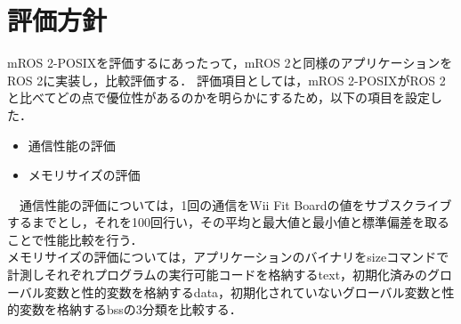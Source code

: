 \documentclass[11pt]{ujarticle}
\begin{document}
\section{評価方針}
mROS 2-POSIXを評価するにあったって，mROS 2と同様のアプリケーションをROS 2に実装し，比較評価する．
評価項目としては，mROS 2-POSIXがROS 2と比べてどの点で優位性があるのかを明らかにするため，以下の項目を設定した．
\begin{itemize}
	\item 通信性能の評価
	\item メモリサイズの評価
\end{itemize}
　通信性能の評価については，1回の通信をWii Fit Boardの値をサブスクライブするまでとし，それを100回行い，その平均と最大値と最小値と標準偏差を取ることで性能比較を行う．
\\メモリサイズの評価については，アプリケーションのバイナリをsizeコマンドで計測しそれぞれプログラムの実行可能コードを格納するtext，初期化済みのグローバル変数と性的変数を格納するdata，初期化されていないグローバル変数と性的変数を格納するbssの3分類を比較する．
\end{document}

